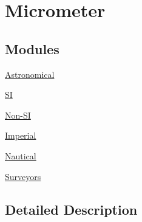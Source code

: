 \hypertarget{group___e_g_x_math-_conversions-_length_conversions-_micrometer}{}\section{Micrometer}
\label{group___e_g_x_math-_conversions-_length_conversions-_micrometer}
\subsection*{Modules}
\begin{DoxyCompactItemize}
\item 
\mbox{\hyperlink{group___e_g_x_math-_conversions-_length_conversions-_micrometer-_astronomical}{Astronomical}}
\item 
\mbox{\hyperlink{group___e_g_x_math-_conversions-_length_conversions-_micrometer-_s_i}{SI}}
\item 
\mbox{\hyperlink{group___e_g_x_math-_conversions-_length_conversions-_micrometer-_non-_s_i}{Non-\/\+SI}}
\item 
\mbox{\hyperlink{group___e_g_x_math-_conversions-_length_conversions-_micrometer-_imperial}{Imperial}}
\item 
\mbox{\hyperlink{group___e_g_x_math-_conversions-_length_conversions-_micrometer-_nautical}{Nautical}}
\item 
\mbox{\hyperlink{group___e_g_x_math-_conversions-_length_conversions-_micrometer-_surveyors}{Surveyors}}
\end{DoxyCompactItemize}


\subsection{Detailed Description}
